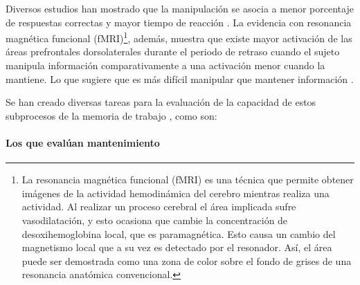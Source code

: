\documentclass[12pt,letterpaper,final]{article}
\let\cite\cite %
\begin{document}
Diversos estudios han mostrado que la manipulación se asocia a menor porcentaje de respuestas correctas y mayor tiempo de reacción \cite{DEsposito1999,Glahn2002,Liu2010}. La evidencia con resonancia magnética funcional (fMRI)\footnote{La resonancia magnética funcional (fMRI) es una técnica que permite obtener imágenes de la actividad hemodinámica del cerebro mientras realiza una actividad. Al realizar un proceso cerebral el área implicada sufre vasodilatación, y esto ocasiona que cambie la concentración de desoxihemoglobina local, que es paramagnética. Esto causa un cambio del magnetismo local que a su vez es detectado por el resonador. Así, el área puede ser demostrada como una zona de color sobre el fondo de grises de una resonancia anatómica convencional.}, además, muestra que existe mayor activación de las áreas prefrontales dorsolaterales durante el periodo de retraso cuando el sujeto manipula información comparativamente a una activación menor cuando la mantiene. Lo que sugiere que es más difícil manipular que mantener información \cite{DEsposito1999}.

Se han creado diversas tareas para la evaluación de la capacidad de estos subprocesos de la memoria de trabajo \cite{Dehn2008}, como son: 

\paragraph*{Los que evalúan mantenimiento}
\end{document}
